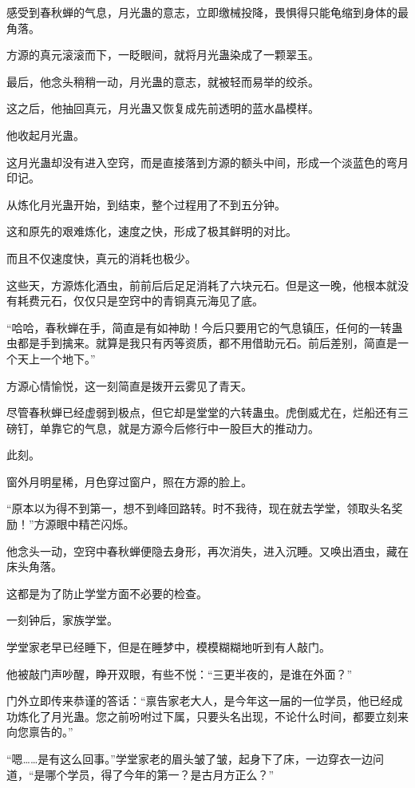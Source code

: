\begin{this_body}
感受到春秋蝉的气息，月光蛊的意志，立即缴械投降，畏惧得只能龟缩到身体的最角落。

方源的真元滚滚而下，一眨眼间，就将月光蛊染成了一颗翠玉。

最后，他念头稍稍一动，月光蛊的意志，就被轻而易举的绞杀。

这之后，他抽回真元，月光蛊又恢复成先前透明的蓝水晶模样。

他收起月光蛊。

这月光蛊却没有进入空窍，而是直接落到方源的额头中间，形成一个淡蓝色的弯月印记。

从炼化月光蛊开始，到结束，整个过程用了不到五分钟。

这和原先的艰难炼化，速度之快，形成了极其鲜明的对比。

而且不仅速度快，真元的消耗也极少。

这些天，方源炼化酒虫，前前后后足足消耗了六块元石。但是这一晚，他根本就没有耗费元石，仅仅只是空窍中的青铜真元海见了底。

“哈哈，春秋蝉在手，简直是有如神助！今后只要用它的气息镇压，任何的一转蛊虫都是手到擒来。就算是我只有丙等资质，都不用借助元石。前后差别，简直是一个天上一个地下。”

方源心情愉悦，这一刻简直是拨开云雾见了青天。

尽管春秋蝉已经虚弱到极点，但它却是堂堂的六转蛊虫。虎倒威尤在，烂船还有三磅钉，单靠它的气息，就是方源今后修行中一股巨大的推动力。

此刻。

窗外月明星稀，月色穿过窗户，照在方源的脸上。

“原本以为得不到第一，想不到峰回路转。时不我待，现在就去学堂，领取头名奖励！”方源眼中精芒闪烁。

他念头一动，空窍中春秋蝉便隐去身形，再次消失，进入沉睡。又唤出酒虫，藏在床头角落。

这都是为了防止学堂方面不必要的检查。

一刻钟后，家族学堂。

学堂家老早已经睡下，但是在睡梦中，模模糊糊地听到有人敲门。

他被敲门声吵醒，睁开双眼，有些不悦：“三更半夜的，是谁在外面？”

门外立即传来恭谨的答话：“禀告家老大人，是今年这一届的一位学员，他已经成功炼化了月光蛊。您之前吩咐过下属，只要头名出现，不论什么时间，都要立刻来向您禀告的。”

“嗯……是有这么回事。”学堂家老的眉头皱了皱，起身下了床，一边穿衣一边问道，“是哪个学员，得了今年的第一？是古月方正么？”


\end{this_body}
